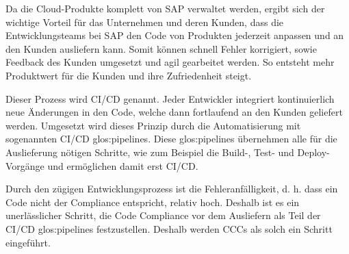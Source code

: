 \documentclass[../main.tex]{subfiles}
\begin{document}
Da die Cloud-Produkte komplett von SAP verwaltet werden, ergibt sich der wichtige Vorteil für das Unternehmen und deren Kunden, dass die Entwicklungsteams bei SAP den Code von Produkten jederzeit anpassen und an den Kunden ausliefern kann.
Somit können schnell Fehler korrigiert, sowie Feedback des Kunden umgesetzt und agil gearbeitet werden.
So entsteht mehr Produktwert für die Kunden und ihre Zufriedenheit steigt.


Dieser Prozess wird \gls{CI/CD} genannt.
Jeder Entwickler integriert kontinuierlich neue Änderungen in den Code, welche dann fortlaufend an den Kunden geliefert werden.
Umgesetzt wird dieses Prinzip durch die Automatisierung mit sogenannten \gls{CI/CD} \glspl{glos:pipeline}.
Diese \glspl{glos:pipeline} übernehmen alle für die Auslieferung nötigen Schritte, wie zum Beispiel die Build-, Test- und Deploy-Vorgänge und ermöglichen damit erst \gls{CI/CD}.
\cite{CI/CD}

Durch den zügigen Entwicklungsprozess ist die Fehleranfälligkeit, d. h. dass ein Code nicht der Compliance entspricht, relativ hoch.
Deshalb ist es ein unerlässlicher Schritt, die Code Compliance vor dem Ausliefern als Teil der \gls{CI/CD} \glspl{glos:pipeline} festzustellen.
Deshalb werden \glspl{CCC} als solch ein Schritt eingeführt.
\end{document}
